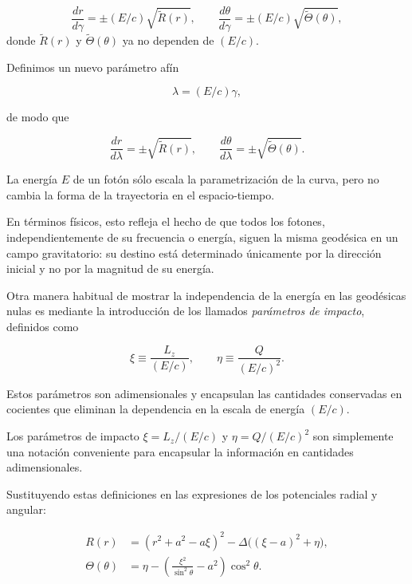 \begin{equation}
    \frac{dr}{d\gamma} = \pm (E/c) \sqrt{\tilde{R}(r)}, \qquad
    \frac{d\theta}{d\gamma} = \pm (E/c) \sqrt{\tilde{\Theta}(\theta)},
\end{equation}
donde \(\tilde{R}(r)\) y \(\tilde{\Theta}(\theta)\) ya no dependen de \((E/c)\).

Definimos un nuevo parámetro afín

\begin{equation}
    \lambda = (E/c)\gamma,
\end{equation}

de modo que

\begin{equation}
    \frac{dr}{d\lambda} = \pm \sqrt{\tilde{R}(r)}, \qquad
    \frac{d\theta}{d\lambda} = \pm \sqrt{\tilde{\Theta}(\theta)}.
\end{equation}

La energía \(E\) de un fotón sólo escala la parametrización de la curva,
pero no cambia la forma de la trayectoria en el espacio-tiempo.

En términos físicos, esto refleja el hecho de que todos los fotones, independientemente  de su frecuencia o energía, siguen la misma geodésica en un campo gravitatorio:
su destino está determinado únicamente por la dirección inicial y no por la magnitud de su energía.


Otra manera habitual de mostrar la independencia de la energía en las geodésicas nulas es mediante la introducción de los llamados \emph{parámetros de impacto}, definidos como

\begin{equation}
    \xi \equiv \frac{L_z}{(E/c)}, \qquad \eta \equiv \frac{Q}{(E/c)^2}.
\end{equation}

Estos parámetros son adimensionales y encapsulan las cantidades conservadas en cocientes
que eliminan la dependencia en la escala de energía \((E/c)\).


Los parámetros de impacto \(\xi=L_z/(E/c)\) y \(\eta=Q/(E/c)^2\) son simplemente
una notación conveniente para encapsular la información en cantidades adimensionales.

Sustituyendo estas definiciones en las expresiones de los potenciales radial y angular:

\begin{align}
    R(r)           & =  (r^2+a^2 - a\xi)^2 - \Delta\big((\xi - a)^2 + \eta \big) ,           \\
    \Theta(\theta) & =  \eta - \left( \frac{\xi^2}{\sin^2\theta} - a^2 \right)\cos^2\theta .
\end{align}

